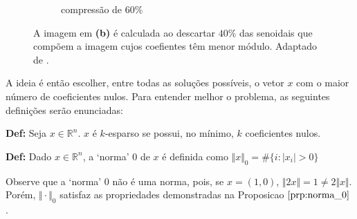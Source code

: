 {\begin{figure}
\begin{center}
\begin{subfigure}[b]{1\textwidth}
        \caption{compressão de $60\%$}
    \end{subfigure}
    \caption[]{A imagem em {\bf (b)} é calculada ao descartar $40\%$ das senoidais que compõem a imagem cujos coefientes têm menor módulo. Adaptado de \protect \footnotemark .}
     \label{fig:coeficientes_altos}
\end{center}
\end{figure}
}

A ideia é então escolher, entre todas as soluções possíveis, o vetor $x$ com o maior número de coeficientes nulos. Para entender melhor o problema, as seguintes definições serão enunciadas:

\textbf{Def:} Seja $x \in \mathbb{R}^n$. $x$ é $k$-esparso se possui, no mínimo, $k$ coeficientes nulos.

\textbf{Def:} Dado $x \in \mathbb{R}^n$, a `norma' $0$ de $x$ é definida como
$\Vert x \Vert_{0} = \# \lbrace i : \vert x_i \vert > 0 \rbrace$ 

Observe que a `norma' 0 não é uma norma, pois, se $x = (1, 0)$, $\Vert 2x \Vert = 1 \neq 2 \Vert x \Vert$. Porém, $\Vert \cdot \Vert_0$ satisfaz as propriedades demonstradas na Proposicao $\ref{prp:norma_0}$ .

